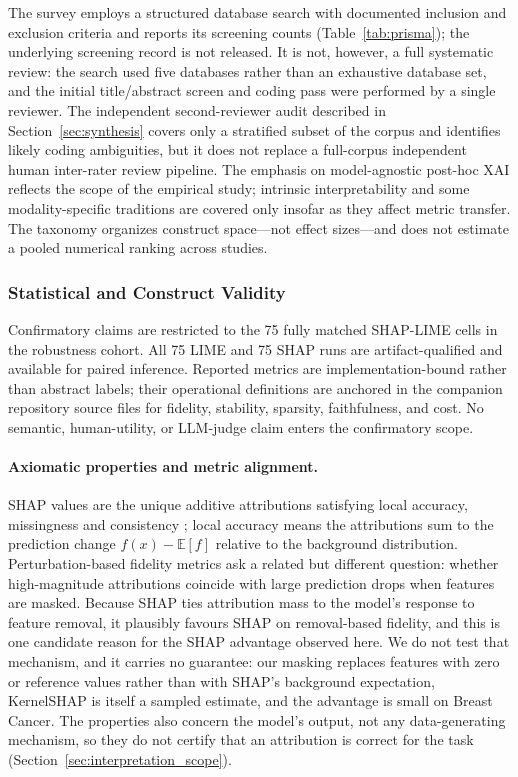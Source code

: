 \documentclass[fleqn,10pt,lineno]{wlpeerj}
\begin{document}
The survey employs a structured database search with documented inclusion
and exclusion criteria and reports its screening counts
(Table~\ref{tab:prisma}); the underlying screening record is not released.
It is not, however, a full systematic review:
the search used five databases rather than an exhaustive database set,
and the initial title/abstract screen and coding pass were performed by a
single reviewer. The independent second-reviewer audit described in
Section~\ref{sec:synthesis} covers only a stratified subset of the corpus
and identifies likely coding ambiguities, but it does not replace a
full-corpus independent human inter-rater review pipeline.
The emphasis on model-agnostic post-hoc XAI reflects the scope of the
empirical study; intrinsic interpretability and some modality-specific
traditions are covered only insofar as they affect metric transfer. The
taxonomy organizes construct space---not effect sizes---and does not
estimate a pooled numerical ranking across studies.

\subsubsection{Statistical and Construct Validity}

Confirmatory claims are restricted to the 75 fully matched SHAP-LIME
cells in the robustness cohort. All 75 LIME and 75 SHAP runs are artifact-qualified and available
for paired inference. Reported metrics are implementation-bound
rather than abstract labels; their operational definitions are anchored
in the companion repository source files for fidelity, stability,
sparsity, faithfulness, and cost. No semantic, human-utility, or
LLM-judge claim enters the confirmatory scope.

\paragraph{Axiomatic properties and metric alignment.}
SHAP values are the unique additive attributions satisfying local accuracy,
missingness and consistency \citep{lundberg2017unified}; local accuracy means
the attributions sum to the prediction change $f(x) - \mathbb{E}[f]$ relative
to the background distribution. Perturbation-based fidelity metrics ask a
related but different question: whether high-magnitude attributions coincide
with large prediction drops when features are masked. Because SHAP ties
attribution mass to the model's response to feature removal, it plausibly
favours SHAP on removal-based fidelity, and this is one candidate reason for
the SHAP advantage observed here. We do not test that mechanism, and it
carries no guarantee: our masking replaces features with zero or reference
values rather than with SHAP's background expectation, KernelSHAP is itself
a sampled estimate, and the advantage is small on Breast Cancer. The
properties also concern the model's output, not any data-generating
mechanism, so they do not certify that an attribution is correct for the
task (Section~\ref{sec:interpretation_scope}).
\end{document}
